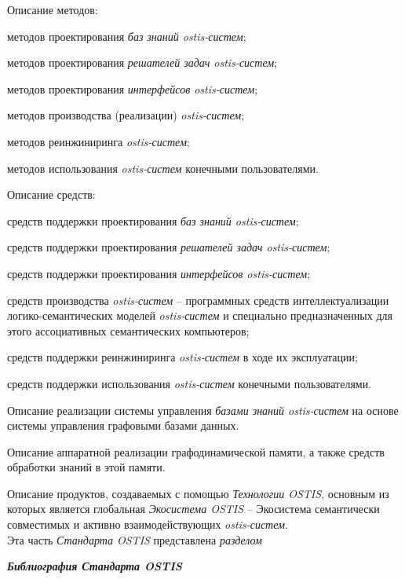 \begin{SCn}
{\begin{scnitemize}
\begin{scnitemizeii}
			
				\item Описание методов:
				\begin{scnitemizeiii}
					\item методов проектирования \textit{баз знаний ostis-систем};
					\item методов проектирования \textit{решателей задач ostis-систем};
					\item методов проектирования \textit{интерфейсов ostis-систем};
					\item методов производства (реализации) \textit{ostis-систем};
					\item методов реинжиниринга \textit{ostis-систем};
					\item методов использования \textit{ostis-систем} конечными пользователями.
				\end{scnitemizeiii}
				\item Описание средств:
				\begin{scnitemizeiii}
					\item средств поддержки проектирования \textit{баз знаний ostis-систем};
					\item средств поддержки проектирования \textit{решателей задач ostis-систем};
					\item средств поддержки проектирования \textit{интерфейсов ostis-систем};
					\item средств производства \textit{ostis-систем} -- программных средств интеллектуализации логико-семантических моделей \textit{ostis-систем} и специально предназначенных для этого ассоциативных семантических компьютеров;
					\item средств поддержки реинжиниринга \textit{ostis-систем} в ходе их эксплуатации;
					\item средств поддержки использования \textit{ostis-систем} конечными пользователями.
				\end{scnitemizeiii}
				\item Описание реализации системы управления \textit{базами знаний ostis-систем} на основе системы управления графовыми базами данных.
				\item Описание аппаратной реализации графодинамической памяти, а также средств обработки знаний в этой памяти.
			\end{scnitemizeii}
			\item Описание продуктов, создаваемых с помощью \textit{Технологии OSTIS}, основным из которых является глобальная \textit{Экосистема OSTIS} -- Экосистема семантически совместимых и активно взаимодействующих \textit{ostis-систем}.\\
			Эта часть \textit{Стандарта OSTIS} представлена \textit{разделом} 
			\item \textit{\textbf{Библиография Стандарта OSTIS}}
	\end{scnitemize}}
\end{SCn}